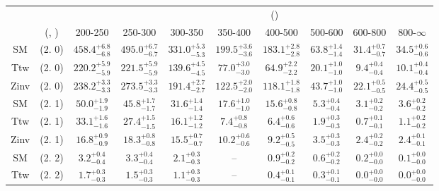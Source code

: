 \begin{table}[h!]
\tiny
\centering
{}
\begin{tabular}
{cccccccccc}
	\hline\hline
&	&	& \multicolumn{8}{c}{\scalht (\gev)}\\ 
	&	 (\njet, \nb) & 200-250 & 250-300 & 300-350 & 350-400 & 400-500 & 500-600 & 600-800 & 800-$\infty$ \\ [0.8ex] 
\hline
	SM & (2. 0) & $458.4^{+ 6.8 }_{- 6.8 }$ & $495.0^{+ 6.7 }_{- 6.7 }$ & $331.0^{+ 5.3 }_{- 5.3 }$ & $199.5^{+ 3.6 }_{- 3.6 }$ & $183.1^{+ 2.8 }_{- 2.8 }$ & $63.8^{+ 1.4 }_{- 1.4 }$ & $31.4^{+ 0.7 }_{- 0.7 }$ & $34.5^{+ 0.6 }_{- 0.6 }$ \\[0.5ex] 
	Ttw & (2. 0) & $220.2^{+ 5.9 }_{- 5.9 }$ & $221.5^{+ 5.9 }_{- 5.9 }$ & $139.6^{+ 4.5 }_{- 4.5 }$ & $77.0^{+ 3.0 }_{- 3.0 }$ & $64.9^{+ 2.2 }_{- 2.2 }$ & $20.1^{+ 1.0 }_{- 1.0 }$ & $9.4^{+ 0.4 }_{- 0.4 }$ & $10.1^{+ 0.4 }_{- 0.4 }$ \\[0.5ex] 
	Zinv & (2. 0) & $238.2^{+ 3.3 }_{- 3.3 }$ & $273.5^{+ 3.3 }_{- 3.3 }$ & $191.4^{+ 2.7 }_{- 2.7 }$ & $122.5^{+ 2.0 }_{- 2.0 }$ & $118.1^{+ 1.8 }_{- 1.8 }$ & $43.7^{+ 1.0 }_{- 1.0 }$ & $22.1^{+ 0.5 }_{- 0.5 }$ & $24.4^{+ 0.5 }_{- 0.5 }$ \\[0.5ex] 
	SM & (2. 1) & $50.0^{+ 1.9 }_{- 1.9 }$ & $45.8^{+ 1.7 }_{- 1.7 }$ & $31.6^{+ 1.4 }_{- 1.4 }$ & $17.6^{+ 1.0 }_{- 1.0 }$ & $15.6^{+ 0.8 }_{- 0.8 }$ & $5.3^{+ 0.4 }_{- 0.4 }$ & $3.1^{+ 0.2 }_{- 0.2 }$ & $3.6^{+ 0.2 }_{- 0.2 }$ \\[0.5ex] 
	Ttw & (2. 1) & $33.1^{+ 1.6 }_{- 1.6 }$ & $27.4^{+ 1.5 }_{- 1.5 }$ & $16.1^{+ 1.2 }_{- 1.2 }$ & $7.4^{+ 0.8 }_{- 0.8 }$ & $6.4^{+ 0.6 }_{- 0.6 }$ & $1.9^{+ 0.3 }_{- 0.3 }$ & $0.7^{+ 0.1 }_{- 0.1 }$ & $1.1^{+ 0.2 }_{- 0.2 }$ \\[0.5ex] 
	Zinv & (2. 1) & $16.8^{+ 0.9 }_{- 0.9 }$ & $18.3^{+ 0.8 }_{- 0.8 }$ & $15.5^{+ 0.7 }_{- 0.7 }$ & $10.2^{+ 0.6 }_{- 0.6 }$ & $9.2^{+ 0.5 }_{- 0.5 }$ & $3.5^{+ 0.3 }_{- 0.3 }$ & $2.4^{+ 0.2 }_{- 0.2 }$ & $2.4^{+ 0.1 }_{- 0.1 }$ \\[0.5ex] 
	SM & (2. 2) & $3.2^{+ 0.4 }_{- 0.4 }$ & $3.3^{+ 0.4 }_{- 0.4 }$ & $2.1^{+ 0.3 }_{- 0.3 }$ & -- & $0.9^{+ 0.2 }_{- 0.2 }$ & $0.6^{+ 0.2 }_{- 0.2 }$ & $0.2^{+ 0.0 }_{- 0.0 }$ & $0.1^{+ 0.0 }_{- 0.0 }$ \\[0.5ex] 
	Ttw & (2. 2) & $1.7^{+ 0.3 }_{- 0.3 }$ & $1.5^{+ 0.3 }_{- 0.3 }$ & $1.1^{+ 0.3 }_{- 0.3 }$ & -- & $0.4^{+ 0.1 }_{- 0.1 }$ & $0.3^{+ 0.1 }_{- 0.1 }$ & $0.0^{+ 0.0 }_{- 0.0 }$ & $0.0^{+ 0.0 }_{- 0.0 }$ \\[0.5ex] 

\end{tabular}
\end{table}
